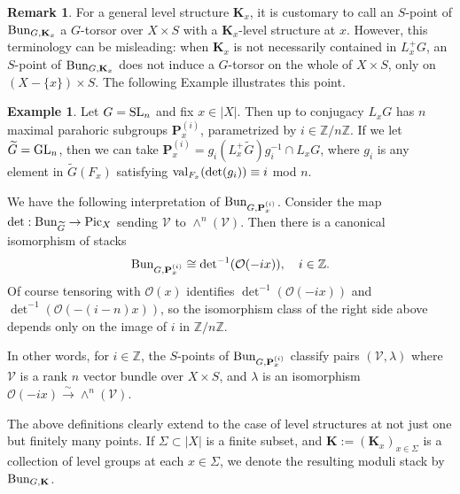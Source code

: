 \documentclass[11pt]{amsart}
\numberwithin{equation}{section}
\theoremstyle{plain}
\theoremstyle{definition}
\newtheorem{remark}[subsubsection]{Remark}
\newtheorem{exam}[subsubsection]{Example}
\def\ZZ{\mathbb{Z}}
\newcommand\cO{\mathcal{O}}
\newcommand\cV{\mathcal{V}}
\def\bK{\mathbf{K}}
\def\bP{\mathbf{P}}
\newcommand{\Bun}{\textup{Bun}}
\newcommand{\Pic}{\textup{Pic}}
\newcommand\Spec{\textup{Spec}\ }
\newcommand{\val}{\textup{val}}
\newcommand\GL{\textup{GL}}
\newcommand\SL{\textup{SL}}
\newcommand{\isom}{\stackrel{\sim}{\to}}
\newcommand{\wt}[1]{\widetilde{#1}}
\newcommand{\Sig}{\Sigma}
\renewcommand{\l}{\lambda}
\begin{document}
\begin{remark} For a general level structure $\bK_{x}$,  it is customary to call an $S$-point of $\Bun_{G,\bK_{x}}$ a $G$-torsor over $X\times S$ with a $\bK_{x}$-level structure at $x$. However, this terminology can be misleading: when $\bK_{x}$ is not necessarily contained in $L^{+}_{x}G$, an $S$-point of $\Bun_{G,\bK_{x}}$ does not induce a $G$-torsor on the whole of $X\times S$, only on $(X-\{x\})\times S$. The following Example illustrates this point.
\end{remark}



\begin{exam}\label{ex:SL parahoric} Let $G=\SL_{n}$ and fix $x\in |X|$. Then up to conjugacy $L_{x}G$ has $n$ maximal parahoric subgroups $\bP^{(i)}_{x}$, parametrized by $i\in \ZZ/n\ZZ$. If we let $\wt G=\GL_{n}$, then we can take $\bP^{(i)}_{x}=g_{i}(L^{+}_{x}\wt G)g_{i}^{-1}\cap L_{x}G$, where $g_{i}$ is any element in $\wt G(F_{x})$ satisfying $\val_{F_{x}}(\det(g_{i}))\equiv i$ mod $n$. 

We have the following interpretation of $\Bun_{G, \bP^{(i)}_{x}}$. Consider the map $\det: \Bun_{\wt G}\to \Pic_{X}$ sending $\cV$ to $\wedge^{n}(\cV)$. Then there is a canonical isomorphism of stacks
\begin{equation*}
\Bun_{G, \bP^{(i)}_{x}}\cong {\det}^{-1}(\cO(-ix)), \quad i\in \ZZ.
\end{equation*}
Of course tensoring with $\cO(x)$ identifies $\det^{-1}(\cO(-ix))$ and $\det^{-1}(\cO(-(i-n)x))$, so the isomorphism class of the right side above depends only on the image of $i$ in $\ZZ/n\ZZ$. 

In other words, for $i\in \ZZ$, the $S$-points of $\Bun_{G, \bP^{(i)}_{x}}$ classify pairs $(\cV,\l)$ where $\cV$ is a rank $n$ vector bundle over $X\times S$, and $\l$ is an isomorphism $\cO(-ix)\isom \wedge^{n}(\cV)$.
\end{exam}


The above definitions clearly extend to the case of level structures at not just one but finitely many points. If $\Sig\subset |X|$ is a finite subset, and $\bK:=(\bK_{x})_{x\in \Sigma}$ is a collection of level groups at each $x\in\Sig $, we denote the resulting moduli stack by $\Bun_{G,\bK}$. 

\end{document}
